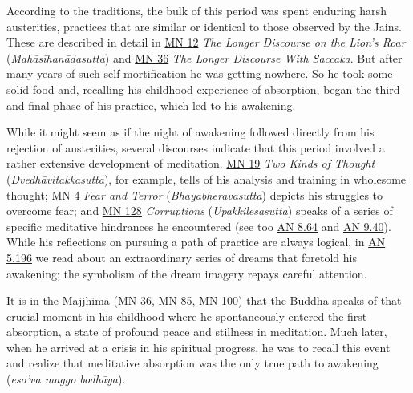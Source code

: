 \documentclass[12pt,openany]{book}%
\begin{document}
According to the traditions, the bulk of this period was spent enduring harsh austerities, practices that are similar or identical to those observed by the Jains. These are described in detail in \href{https://suttacentral.net/mn12}{MN 12} \textit{The Longer Discourse on the Lion’s Roar} (\textit{\textsanskrit{Mahāsīhanādasutta}}) and \href{https://suttacentral.net/mn36}{MN 36} \textit{The Longer Discourse With Saccaka}. But after many years of such self-mortification he was getting nowhere. So he took some solid food and, recalling his childhood experience of absorption, began the third and final phase of his practice, which led to his awakening.

While it might seem as if the night of awakening followed directly from his rejection of austerities, several discourses indicate that this period involved a rather extensive development of meditation. \href{https://suttacentral.net/mn19}{MN 19} \textit{Two Kinds of Thought} (\textit{\textsanskrit{Dvedhāvitakkasutta}}), for example, tells of his analysis and training in wholesome thought; \href{https://suttacentral.net/mn4}{MN 4} \textit{Fear and Terror} (\textit{Bhayabheravasutta}) depicts his struggles to overcome fear; and \href{https://suttacentral.net/mn128}{MN 128} \textit{Corruptions} (\textit{Upakkilesasutta}) speaks of a series of specific meditative hindrances he encountered (see too \href{https://suttacentral.net/an8.64}{AN 8.64} and \href{https://suttacentral.net/an9.40}{AN 9.40}). While his reflections on pursuing a path of practice are always logical, in \href{https://suttacentral.net/an5.196}{AN 5.196} we read about an extraordinary series of dreams that foretold his awakening; the symbolism of the dream imagery repays careful attention.

It is in the Majjhima (\href{https://suttacentral.net/mn36}{MN 36}, \href{https://suttacentral.net/mn85}{MN 85}, \href{https://suttacentral.net/mn100}{MN 100}) that the Buddha speaks of that crucial moment in his childhood where he spontaneously entered the first absorption, a state of profound peace and stillness in meditation. Much later, when he arrived at a crisis in his spiritual progress, he was to recall this event and realize that meditative absorption was the only true path to awakening (\textit{eso’va maggo \textsanskrit{bodhāya}}).
\end{document}
